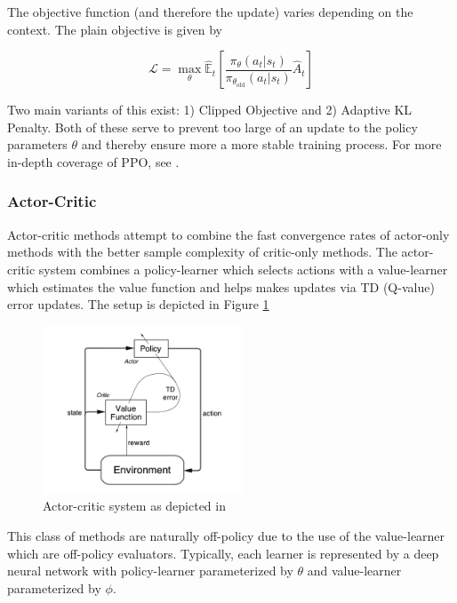 \documentclass[12pt]{article}
\newcommand{\E}{\mathbb{E}}
\begin{document}
\medskip

The objective function (and therefore the update) varies depending on the context. The plain objective is given by

\begin{equation}
\mathcal{L} = \max_{\theta}\hat{\E}_t\left[\frac{\pi_{\theta}(a_t|s_t)}{\pi_{\theta_\text{old}}(a_t|s_t)}\hat{A}_t\right]
\label{eq:plain ppo obj}
\end{equation}

Two main variants of this exist: 1) Clipped Objective and 2) Adaptive KL Penalty. Both of these serve to prevent too large of an update to the policy parameters $\theta$ and thereby ensure more a more stable training process. For more in-depth coverage of PPO, see \cite{Schulman2017}.

\subsubsection{Actor-Critic}

Actor-critic methods attempt to combine the fast convergence rates of actor-only methods with the better sample complexity of critic-only methods. The actor-critic system combines a policy-learner which selects actions with a value-learner which estimates the value function and helps makes updates via TD (Q-value) error updates. The setup is depicted in Figure \ref{fig:actor critic}

\begin{figure}[H]
	\centering
	\includegraphics[height=5cm, width=0.4\linewidth]{actor-critic.png}
	\caption{Actor-critic system as depicted in \cite{SuttonBarto}}
	\label{fig:actor critic}
\end{figure}

This class of methods are naturally off-policy due to the use of the value-learner which are off-policy evaluators. Typically, each learner is represented by a deep neural network with policy-learner parameterized by $\theta$ and value-learner parameterized by $\phi$. \\
\end{document}
